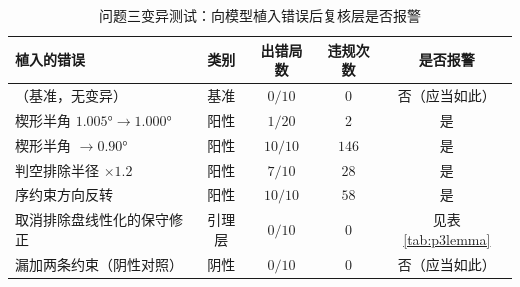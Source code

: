 \documentclass[withoutpreface, bwprint]{cumcmthesis}
\begin{document}
\begin{appendices}
\begin{table}[htbp]
  \centering
  \caption{问题三变异测试：向模型植入错误后复核层是否报警}
  \label{tab:p3mutation}
  \begin{tabular}{lcccc}
    \toprule
    植入的错误 & 类别 & 出错局数 & 违规次数 & 是否报警 \\
    \midrule
    （基准，无变异） & 基准 & $0/10$ & $0$ & 否（应当如此） \\
    楔形半角 $1.005°\to1.000°$ & 阳性 & $1/20$ & $2$ & 是 \\
    楔形半角 $\to0.90°$ & 阳性 & $10/10$ & $146$ & 是 \\
    判空排除半径 $\times1.2$ & 阳性 & $7/10$ & $28$ & 是 \\
    序约束方向反转 & 阳性 & $10/10$ & $58$ & 是 \\
    取消排除盘线性化的保守修正 & 引理层 & $0/10$ & $0$ & 见表 \ref{tab:p3lemma} \\
    漏加两条约束（阴性对照） & 阴性 & $0/10$ & $0$ & 否（应当如此） \\
    \bottomrule
  \end{tabular}
\end{table}


\end{appendices}
\end{document}
